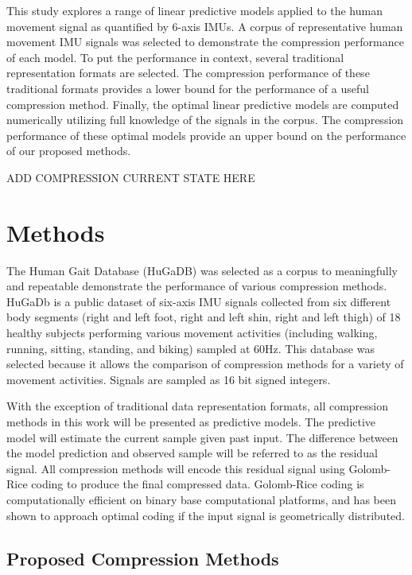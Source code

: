 \documentclass[journal]{IEEEtran}
\begin{document}
This study explores a range of linear predictive models applied to the human movement signal as quantified by 6-axis IMUs. A corpus of representative human movement IMU signals was selected to demonstrate the compression performance of each model. To put the performance in context, several traditional representation formats are selected. The compression performance of these traditional formats provides a lower bound for the performance of a useful compression method. Finally, the optimal linear predictive models are computed numerically utilizing full knowledge of the signals in the corpus. The compression performance of these optimal models provide an upper bound on the performance of our proposed methods.

ADD COMPRESSION CURRENT STATE HERE

\section{Methods}


The Human Gait Database (HuGaDB)\cite{Chereshnev2018} was selected as a corpus to meaningfully and repeatable demonstrate the performance of various compression methods. HuGaDb is a public dataset of six-axis IMU signals collected from six different body segments (right and left foot, right and left shin, right and left thigh) of 18 healthy subjects performing various movement activities (including walking, running, sitting, standing, and biking) sampled at 60Hz. This database was selected because it allows the comparison of compression methods for a variety of movement activities. Signals are sampled as 16 bit signed integers.

With the exception of traditional data representation formats, all compression methods in this work will be presented as predictive models. The predictive model will estimate the current sample given past input. The difference between the model prediction and observed sample will be referred to as the residual signal. All compression methods will encode this residual signal using Golomb-Rice coding to produce the final compressed data. Golomb-Rice coding is computationally efficient on binary base computational platforms, and has been shown to approach optimal coding if the input signal is geometrically distributed\cite{Golomb1966}\cite{F.Rice1979}.

\subsection{Proposed Compression Methods}
\end{document}
